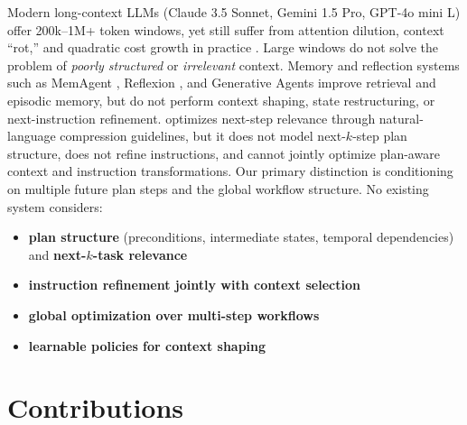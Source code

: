\documentclass{article}
\theoremstyle{plain}
\theoremstyle{definition}
\theoremstyle{remark}
\begin{document}
 
Modern long-context LLMs (Claude 3.5 Sonnet, Gemini 1.5 Pro, GPT-4o mini L) offer 
200k–1M+ token windows, yet still suffer from attention dilution, context “rot,” and 
quadratic cost growth in practice \citep{zaheer2020bigbird, guo2021longt5}. 
Large windows do not solve the problem of \emph{poorly structured} or \emph{irrelevant} 
context. Memory and reflection systems such as MemAgent \citep{yu2025memagent}, Reflexion 
\citep{shinn2023reflexion}, and Generative Agents \citep{park2023generative} improve 
retrieval and episodic memory, but do not perform context shaping, 
state restructuring, or next-instruction refinement. \citet{acon2025yu} optimizes next-step relevance through natural-language 
compression guidelines, but it does not model next-$k$-step plan structure, 
does not refine instructions, and cannot jointly optimize plan-aware 
context and instruction transformations.  Our primary distinction is conditioning on multiple future plan steps and the global workflow structure. No existing system considers:
\begin{itemize}[topsep=2pt,itemsep=1pt,parsep=0pt]
    \item \textbf{plan structure} (preconditions, intermediate states, temporal dependencies) and \textbf{next-$k$-task relevance}
    \item \textbf{instruction refinement jointly with context selection}
    \item \textbf{global optimization over multi-step workflows}
    \item \textbf{learnable policies for context shaping}
\end{itemize}



\vspace{-3mm}
\section*{Contributions}
\vspace{-2mm}
\end{document}
